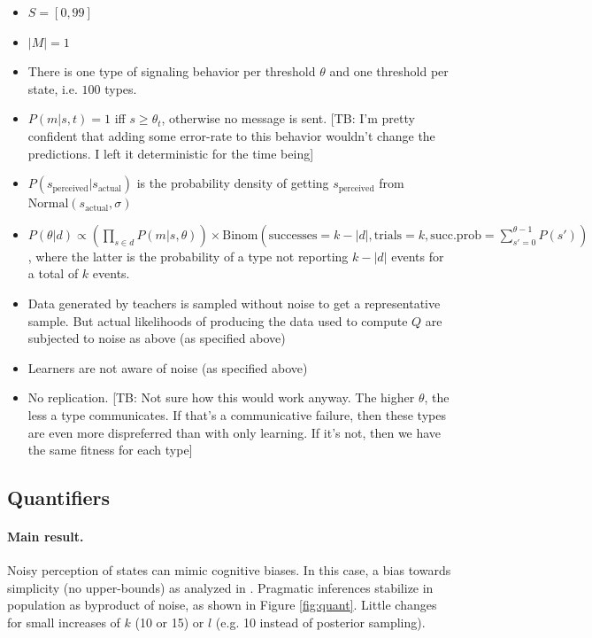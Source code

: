 \documentclass[10pt,a4paper]{article}
\newcommand{\tb}[1]{\textcolor[rgb]{.8,.33,.0}{[TB: #1]}}%
\begin{document}
\begin{itemize}
  \item $S = [0,99]$
  \item $|M| = 1$
  \item There is one type of signaling behavior per threshold $\theta$ and one threshold per state, i.e. $100$ types.
  \item $P(m|s,t) = 1$ iff $s \geq \theta_t$, otherwise no message is sent. \tb{I'm pretty confident that adding some error-rate to this behavior wouldn't change the predictions. I left it deterministic for the time being}
  \item $P(s_{\text{perceived}} | s_{\text{actual}})$ is the probability density of getting $s_{\text{perceived}}$ from $\text{Normal}(s_{\text{actual}},\sigma)$
  \item $P(\theta | d) \propto (\prod_{s \in d} P(m|s,\theta)) \times \text{Binom}(\text{successes} = k-|d|, \text{trials} = k, \text{succ.prob} = \sum_{s'=0}^{\theta-1} P(s'))$, where the latter is the probability of a type not reporting $k-|d|$ events for a total of $k$ events.
  \item Data generated by teachers is sampled without noise to get a representative sample. But actual likelihoods of producing the data used to compute $Q$ are subjected to noise as above (as specified above)
  \item Learners are not aware of noise (as specified above)
  \item No replication. \tb{Not sure how this would work anyway. The higher $\theta$, the less a type communicates. If that's a communicative failure, then these types are even more dispreferred than with only learning. If it's not, then we have the same fitness for each type}
\end{itemize}

\subsection{Quantifiers}
\paragraph{Main result.} Noisy perception of states can mimic cognitive biases. In this case, a bias towards simplicity (no upper-bounds) as analyzed in \citet{brochhagen+etal:2016:CogSci}. Pragmatic inferences stabilize in population as byproduct of noise, as shown in Figure \ref{fig:quant}. Little changes for small increases of $k$ (10 or 15) or $l$ (e.g. 10 instead of posterior sampling).
\end{document}
